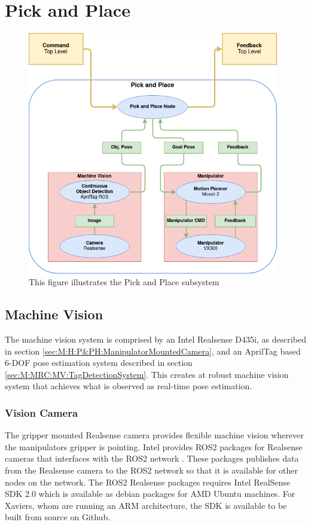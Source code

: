 \section{Pick and Place} \label{M:PickAndPlace}

\begin{figure}[htp]
  \centering
  \includegraphics[width = 0.98\textwidth]{Figures/figPickAndPlaceMethod.drawio.png}
  \caption{This figure illustrates the Pick and Place subsystem}
  \label{fig:M:PAP:PickAndPlaceMethod}
\end{figure}

\subsection{Machine Vision} \label{sec:M:MRC:MachineVision}
The machine vision system is comprised by an Intel Realsense D435i, as described in section \ref{sec:M:H:P&PH:ManipulatorMountedCamera}, and an AprilTag based 6-DOF pose estimation system described in section \ref{sec:M:MRC:MV:TagDetectionSystem}. This creates at robust machine vision system that achieves what is observed as real-time pose estimation.

\subsubsection{Vision Camera} 
The gripper mounted Realsense camera provides flexible machine vision wherever the manipulators gripper is pointing. Intel provides ROS2 packages for Realsense cameras that interfaces with the ROS2 network \cite{realsense_ros_repo}. These packages publishes data from the Realsense camera to the ROS2 network so that it is available for other nodes on the network. The ROS2 Realsense packages requires Intel RealSense SDK 2.0 which is available as debian packages for AMD Ubuntu machines. For Xaviers, whom are running an ARM architecture, the SDK is available to be built from source on Github\cite{realsense_jetson_guide}.

